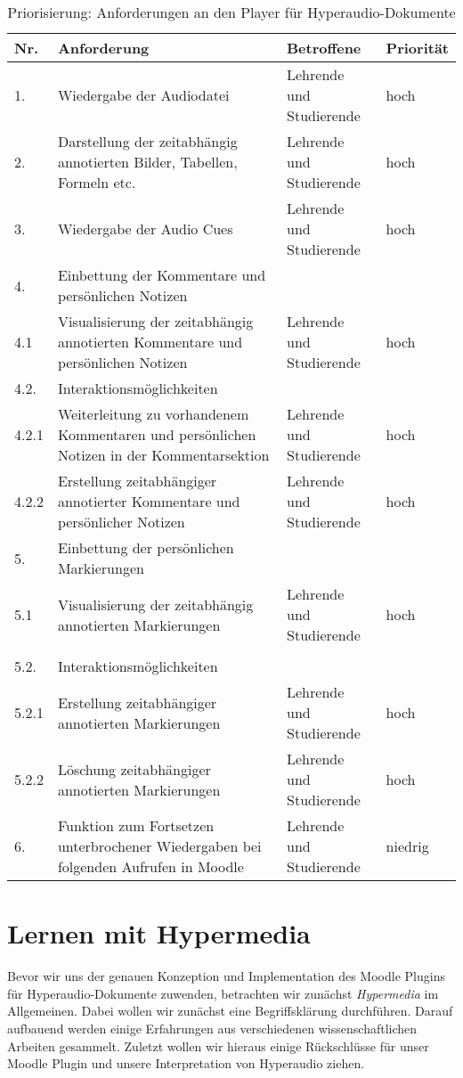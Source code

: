 \begin{table}[!ht]
\def\arraystretch{1.4}
\caption{Priorisierung: Anforderungen an den Player für Hyperaudio-Dokumente}
\label{tab:PriorisierungAnforderungenPlayer}
 \begin{tabularx}{\textwidth}{lXll}      
    \hline
    Nr. & Anforderung & Betroffene & Priorität
    \\\hline
    1. & Wiedergabe der Audiodatei & Lehrende und Studierende & hoch\\
    2. & Darstellung der zeitabhängig annotierten Bilder, Tabellen, Formeln etc. & Lehrende und Studierende & hoch\\
    3. & Wiedergabe der Audio Cues & Lehrende und Studierende & hoch\\
    4. & Einbettung der Kommentare und persönlichen Notizen & \\
    4.1 & Visualisierung der zeitabhängig annotierten Kommentare und persönlichen Notizen & Lehrende und Studierende & hoch\\
    4.2. & Interaktionsmöglichkeiten & \\
    4.2.1 & Weiterleitung zu vorhandenem Kommentaren und persönlichen Notizen in der Kommentarsektion  & Lehrende und Studierende & hoch\\
    4.2.2 & Erstellung zeitabhängiger annotierter Kommentare und persönlicher Notizen & Lehrende und Studierende & hoch\\
    5. & Einbettung der persönlichen Markierungen & \\
    5.1 & Visualisierung der zeitabhängig annotierten Markierungen & Lehrende und Studierende & hoch\\\\
    5.2. & Interaktionsmöglichkeiten & \\
    5.2.1 & Erstellung zeitabhängiger annotierten Markierungen  & Lehrende und Studierende & hoch\\
    5.2.2 & Löschung zeitabhängiger annotierten Markierungen & Lehrende und Studierende & hoch\\
    6. & Funktion zum Fortsetzen unterbrochener Wiedergaben bei folgenden Aufrufen in Moodle & Lehrende und Studierende & niedrig\\
    \hline
    \end{tabularx}
\end{table}

\section{Lernen mit Hypermedia}
Bevor wir uns der genauen Konzeption und Implementation des Moodle Plugins für Hyperaudio-Dokumente zuwenden, betrachten wir zunächst \textit{Hypermedia} im Allgemeinen. Dabei wollen wir zunächst eine Begriffsklärung durchführen. Darauf aufbauend werden einige Erfahrungen aus verschiedenen wissenschaftlichen Arbeiten gesammelt. Zuletzt wollen wir hieraus einige Rückschlüsse für unser Moodle Plugin und unsere Interpretation von Hyperaudio ziehen.

